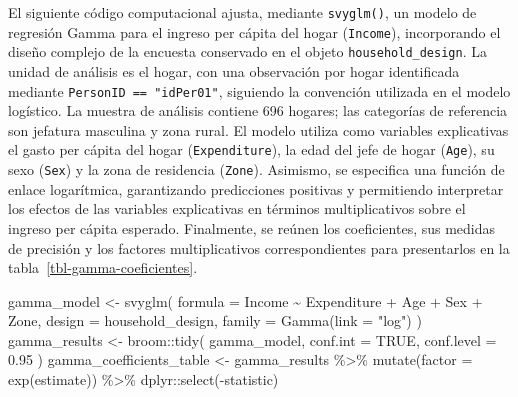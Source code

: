 \documentclass[
  spanish,
  11pt,
  letterpaper,
  oneside,
  open=any]{scrbook}
\newenvironment{Shaded}{\begin{snugshade}}{\end{snugshade}}
\newcommand{\AttributeTok}[1]{\textcolor[rgb]{0.40,0.45,0.13}{#1}}
\newcommand{\ConstantTok}[1]{\textcolor[rgb]{0.56,0.35,0.01}{#1}}
\newcommand{\FloatTok}[1]{\textcolor[rgb]{0.68,0.00,0.00}{#1}}
\newcommand{\FunctionTok}[1]{\textcolor[rgb]{0.28,0.35,0.67}{#1}}
\newcommand{\NormalTok}[1]{\textcolor[rgb]{0.00,0.23,0.31}{#1}}
\newcommand{\OtherTok}[1]{\textcolor[rgb]{0.00,0.23,0.31}{#1}}
\newcommand{\SpecialCharTok}[1]{\textcolor[rgb]{0.37,0.37,0.37}{#1}}
\newcommand{\StringTok}[1]{\textcolor[rgb]{0.13,0.47,0.30}{#1}}
\begin{document}
El siguiente código computacional ajusta, mediante \texttt{svyglm()}, un
modelo de regresión Gamma para el ingreso per cápita del hogar
(\texttt{Income}), incorporando el diseño complejo de la encuesta
conservado en el objeto \texttt{household\_design}. La unidad de
análisis es el hogar, con una observación por hogar identificada
mediante \texttt{PersonID\ ==\ "idPer01"}, siguiendo la convención
utilizada en el modelo logístico. La muestra de análisis contiene 696
hogares; las categorías de referencia son jefatura masculina y zona
rural. El modelo utiliza como variables explicativas el gasto per cápita
del hogar (\texttt{Expenditure}), la edad del jefe de hogar
(\texttt{Age}), su sexo (\texttt{Sex}) y la zona de residencia
(\texttt{Zone}). Asimismo, se especifica una función de enlace
logarítmica, garantizando predicciones positivas y permitiendo
interpretar los efectos de las variables explicativas en términos
multiplicativos sobre el ingreso per cápita esperado. Finalmente, se
reúnen los coeficientes, sus medidas de precisión y los factores
multiplicativos correspondientes para presentarlos en la
tabla~\ref{tbl-gamma-coeficientes}.

\begin{Shaded}
\begin{Highlighting}[]
\NormalTok{gamma\_model }\OtherTok{\textless{}{-}} \FunctionTok{svyglm}\NormalTok{(}
  \AttributeTok{formula =}\NormalTok{ Income }\SpecialCharTok{\textasciitilde{}}\NormalTok{ Expenditure }\SpecialCharTok{+}\NormalTok{ Age }\SpecialCharTok{+}\NormalTok{ Sex }\SpecialCharTok{+}\NormalTok{ Zone,}
  \AttributeTok{design =}\NormalTok{ household\_design,}
  \AttributeTok{family =} \FunctionTok{Gamma}\NormalTok{(}\AttributeTok{link =} \StringTok{"log"}\NormalTok{)}
\NormalTok{)}
\NormalTok{gamma\_results }\OtherTok{\textless{}{-}}\NormalTok{ broom}\SpecialCharTok{::}\FunctionTok{tidy}\NormalTok{(}
\NormalTok{  gamma\_model,}
  \AttributeTok{conf.int =} \ConstantTok{TRUE}\NormalTok{,}
  \AttributeTok{conf.level =} \FloatTok{0.95}
\NormalTok{)}
\NormalTok{gamma\_coefficients\_table }\OtherTok{\textless{}{-}}\NormalTok{ gamma\_results }\SpecialCharTok{\%\textgreater{}\%}
  \FunctionTok{mutate}\NormalTok{(}\AttributeTok{factor =} \FunctionTok{exp}\NormalTok{(estimate)) }\SpecialCharTok{\%\textgreater{}\%}
\NormalTok{  dplyr}\SpecialCharTok{::}\FunctionTok{select}\NormalTok{(}\SpecialCharTok{{-}}\NormalTok{statistic)}
\end{Highlighting}
\end{Shaded}
\end{document}
